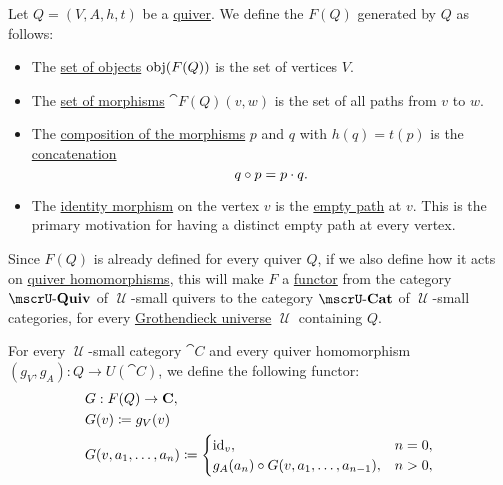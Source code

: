 \begin{definition}\label{def:quiver_free_category}
  Let \( Q = (V, A, h, t) \) be a \hyperref[def:quiver]{quiver}. We define the  \( F(Q) \) generated by \( Q \) as follows:
  \begin{itemize}
    \item The \hyperref[def:category/objects]{set of objects} \( \operatorname{obj}(F(Q)) \) is the set of vertices \( V \).

    \item The \hyperref[def:category/morphisms]{set of morphisms} \( \cat{F(Q)}(v, w) \) is the set of all paths from \( v \) to \( w \).

    \item The \hyperref[def:category/composition]{composition of the morphisms} \( p \) and \( q \) with \( h(q) = t(p) \) is the \hyperref[def:undirected_multigraph_path/concatenation]{concatenation}
    \begin{equation*}
      q \bincirc p = p \cdot q.
    \end{equation*}

    \item The \hyperref[def:category/identity]{identity morphism} on the vertex \( v \) is the \hyperref[def:undirected_multigraph_path/empty]{empty path} at \( v \). This is the primary motivation for having a distinct empty path at every vertex.
  \end{itemize}

  Since \( F(Q) \) is already defined for every quiver \( Q \), if we also define how it acts on \hyperref[eq:def:category_of_small_quivers/homomorphism]{quiver homomorphisms}, this will make \( F \) a \hyperref[def:functor]{functor} from the category \hyperref[def:category_of_small_quivers]{\( \ucat{Quiv} \)} of \( \mscrU \)-small quivers to the category \hyperref[def:category_of_small_quivers]{\( \ucat{Cat} \)} of \( \mscrU \)-small categories, for every \hyperref[def:grothendieck_universe]{Grothendieck universe} \( \mscrU \) containing \( Q \).

  For every \( \mscrU \)-small category \( \cat{C} \) and every quiver homomorphism \( (g_V, g_A): Q \to U(\cat{C}) \), we define the following functor:
  \begin{equation}\label{eq:def:quiver_free_category/functor_from_homomorphism}
    \begin{aligned}
      &G: F(Q) \to \cat{C}, \\
      &G(v) \coloneqq g_V(v) \\
      &G(v, a_1, \ldots, a_n) \coloneqq \begin{cases}
        \id_v,                                        &n = 0, \\
        g_A(a_n) \bincirc G(v, a_1, \ldots, a_{n-1}), &n > 0,
      \end{cases}
    \end{aligned}
  \end{equation}


\end{definition}
